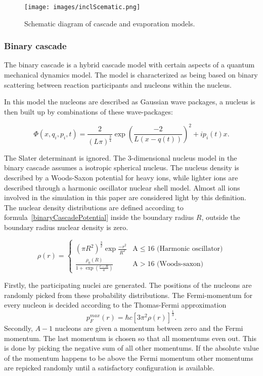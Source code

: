 \begin{figure}[h]
\begin{center}
\texttt{[image: images/inclScematic.png]}  
\caption{\label{fig:inclschematic} Schematic diagram of cascade and evaporation models.}
 
 \end{center}
 \end{figure}

\subsubsection{Binary cascade}
The binary cascade is a hybrid cascade model with certain aspects of a quantum mechanical dynamics model. The model is characterized as being based on binary scattering between reaction participants and nucleons within the nucleus.

In this model the nucleons are described as Gaussian wave packages, a nucleus is then built up by combinations of these wave-packages:


\begin{equation}
\Phi(x,q_i,p_i,t) = \frac{2}{(L\pi)^{\frac{3}{4}}}\exp{\left(\frac{-2}{L(x - q(t))}\right)^2+ip_i(t)x}.
\label{wavePackage}
\end{equation}


The Slater determinant is ignored. The 3-dimensional nucleus model in the binary cascade assumes a isotropic spherical nucleus. The nucleus density is described by a Woods-Saxon potential for heavy ions, while lighter ions are described through a harmonic oscillator nuclear shell model. Almost all ions involved in the simulation in this paper are considered light by this definition. The nuclear density distributions are defined according to formula~\ref{binaryCascadePotential} inside the boundary radius $R$, outside the boundary radius nuclear density is zero.

\begin{equation}
\rho(r) = 
\begin{cases}
(\pi R^2)^{\frac{3}{2}}\exp{\frac{-r^2}{R^2}} & \text{A} \le 16 \text{  (Harmonic oscillator)}\\
\frac{\rho_{0}(R)}{1+\exp({\frac{r-R}{a}})} & \text{A} > 16 \text{  (Woods-saxon)}
\end{cases}
\label{binaryCascadePotential}
\end{equation}

Firstly, the participating nuclei are generated. The positions of the nucleons are randomly picked from these probability distributions. The Fermi-momentum for every nucleon is decided according to the Thomas-Fermi approximation \begin{equation}p^{max}_F(r) = \hbar c [3 \pi^2 \rho(r)]^\frac{1}{3}.\end{equation}Secondly, $A-1$ nucleons are given a momentum between zero and the Fermi momentum. The last momentum is chosen so that all momentums even out. This is done by picking the negative sum of all other momentums. If the absolute value of the momentum happens to be above the Fermi momentum other momentums are repicked randomly until a satisfactory configuration is available.

